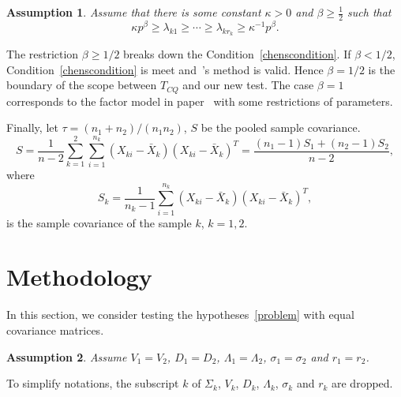 \documentclass[review]{elsarticle}
\theoremstyle{plain}
\newtheorem{assumption}{\quad\quad Assumption}
\theoremstyle{definition}
\theoremstyle{remark}
\begin{document}
\begin{assumption}\label{orderOfBeta}
    Assume that there is some constant $\kappa>0$ and $\beta\geq \frac{1}{2}$ such that
    \begin{equation*}
        \kappa p^{\beta}\geq \lambda_{k1}\geq \cdots \geq\lambda_{kr_k}\geq \kappa^{-1}p^{\beta}.
\end{equation*}
\end{assumption}


The restriction $\beta\geq 1/2$ breaks down the Condition~\eqref{chenscondition}. If $\beta< 1/2$, Condition~\eqref{chenscondition} is meet and~\cite{Chen2010A}'s  method is valid. 
 Hence $\beta=1/2$ is the boundary of the scope between $T_{CQ}$ and our new test.
The case $\beta=1$ corresponds to the factor model in paper~\cite{Ma2015A} with some restrictions of parameters.


Finally, let $\tau={(n_1+n_2)}/{(n_1n_2)}$, $S$ be the pooled sample covariance.
\begin{equation}
S=\frac{1}{n-2}\sum_{k=1}^2\sum_{i=1}^{n_k} (X_{ki}-\bar{X}_k) {(X_{ki}-\bar{X}_k)}^T
    =\frac{(n_1-1)S_1+(n_2-1)S_2}{n-2},
\end{equation}
where
\begin{equation}
S_k=\frac{1}{n_k -1}\sum_{i=1}^{n_k} (X_{ki}-\bar{X}_k) {(X_{ki}-\bar{X}_k)}^T,
\end{equation}
is the sample covariance  of the sample $k$, $k=1,2$.


\section{Methodology}

In this section, we consider testing the hypotheses~\eqref{problem} with equal covariance matrices.
\begin{assumption}\label{theModel2}
Assume $V_1=V_2$, $D_1=D_2$, $\Lambda_1=\Lambda_2$, $\sigma_1=\sigma_2$ and $r_1=r_2$.
\end{assumption}

To simplify notations, the subscript $k$ of $\Sigma_k$, $V_k$, $D_k$, $\Lambda_k$, $\sigma_k$ and $r_k$ are dropped.
\end{document}
